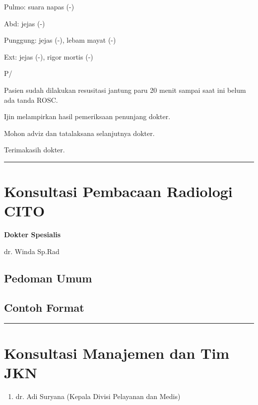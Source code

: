 \documentclass[
]{book}
\providecommand{\tightlist}{%
  \setlength{\itemsep}{0pt}\setlength{\parskip}{0pt}}
\begin{document}
Pulmo: suara napas (-)

Abd: jejas (-)

Punggung: jejas (-), lebam mayat (-)

Ext: jejas (-), rigor mortis (-)

P/

Pasien sudah dilakukan resusitasi jantung paru 20 menit sampai saat ini belum ada tanda ROSC.

Ijin melampirkan hasil pemeriksaan penunjang dokter.

Mohon adviz dan tatalaksana selanjutnya dokter.

Terimakasih dokter.

\begin{center}\rule{0.5\linewidth}{0.5pt}\end{center}

\hypertarget{konsultasi-pembacaan-radiologi-cito}{%
\section{Konsultasi Pembacaan Radiologi CITO}\label{konsultasi-pembacaan-radiologi-cito}}

\textbf{Dokter Spesialis}

dr. Winda Sp.Rad

\hypertarget{pedoman-umum-11}{%
\subsection{Pedoman Umum}\label{pedoman-umum-11}}

\hypertarget{contoh-format-11}{%
\subsection{Contoh Format}\label{contoh-format-11}}

\begin{center}\rule{0.5\linewidth}{0.5pt}\end{center}

\hypertarget{konsultasi-manajemen-dan-tim-jkn}{%
\section{Konsultasi Manajemen dan Tim JKN}\label{konsultasi-manajemen-dan-tim-jkn}}

\begin{enumerate}
\def\labelenumi{\arabic{enumi}.}
\tightlist
\item
  dr. Adi Suryana (Kepala Divisi Pelayanan dan Medis)
\end{enumerate}
\end{document}
